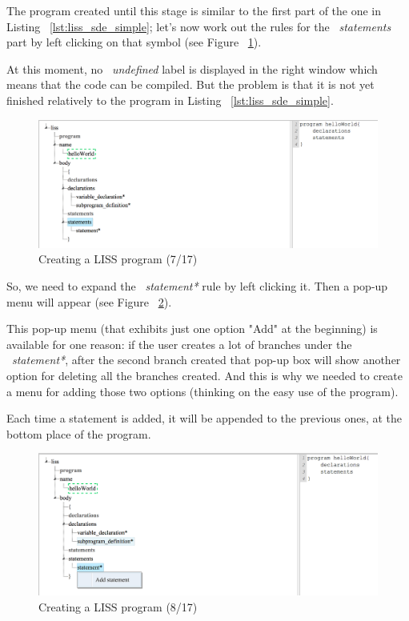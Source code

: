 \documentclass[
  oneside,
  11pt, a4paper,
  footinclude=true,
  headinclude=true,
  cleardoublepage=empty
]{scrbook}
\begin{document}
The program created until this stage is similar to the first part of the one in Listing ~\ref{lst:liss_sde_simple}; let's now work out the rules for the ~\textit{statements} part by left clicking on that symbol (see Figure ~\ref{fig:LISS-SDE_example_7}).

At this moment, no ~\textit{undefined} label is displayed in the right window which means that the code can be compiled. But the problem is that it is not yet finished relatively to the program in Listing ~\ref{lst:liss_sde_simple}.

\begin{figure}[h!]
  \centering
    \includegraphics[width=1\textwidth]{img/LISS-SDE_creating_program/LISS-SDE7.png}
    \caption{Creating a LISS program (7/17)}
    \label{fig:LISS-SDE_example_7}
\end{figure}

So, we need to expand the ~\textit{statement*} rule by left clicking it. Then a pop-up menu will appear (see Figure ~\ref{fig:LISS-SDE_example_8}).

This pop-up menu (that exhibits just one option "Add" at the beginning) is available for one reason: if the user creates a lot of branches under the ~\textit{statement*}, after the second branch created that pop-up box will show another option for deleting all the branches created. And this is why we needed to create a menu for adding those two options (thinking on the easy use of the program).

Each time a statement is added, it will be appended to the previous ones, at the bottom place of the program.

\begin{figure}[h!]
  \centering
    \includegraphics[width=1\textwidth]{img/LISS-SDE_creating_program/LISS-SDE8.png}
    \caption{Creating a LISS program (8/17)}
    \label{fig:LISS-SDE_example_8}
\end{figure}
\end{document}

